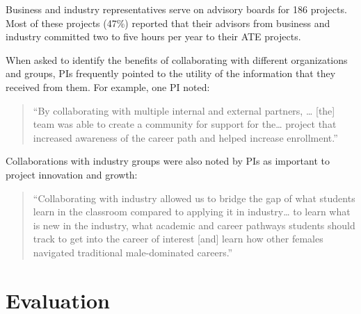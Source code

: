 \documentclass[
]{report}
\begin{document}
Business and industry representatives serve on advisory boards for 186 projects. Most of these projects (47\%) reported that their advisors from business and industry committed two to five hours per year to their ATE projects.

\newpage

When asked to identify the benefits of collaborating with different organizations and groups, PIs frequently pointed to the utility of
the information that they received from them. For example, one PI noted:

\begin{quote}
``By collaborating with multiple internal and external partners, \ldots{} {[}the{]} team was able to create a community for
support for the\ldots{} project that increased awareness of the career path and helped increase enrollment.''
\end{quote}

Collaborations with industry groups were also noted by PIs as important to project innovation and growth:

\begin{quote}
``Collaborating with industry allowed us to bridge the gap of what students learn in the classroom compared to applying it in industry\ldots{} to learn what is new in the industry, what academic and career pathways students should track to get into the career of interest {[}and{]} learn how other females navigated traditional male-dominated careers.''
\end{quote}

\hypertarget{evaluation}{%
\chapter{Evaluation}\label{evaluation}}
\end{document}
